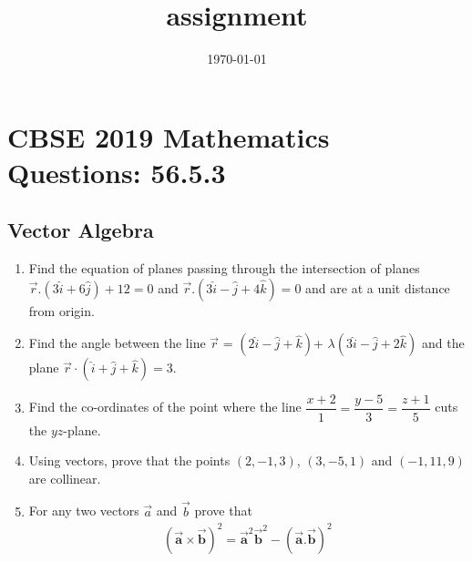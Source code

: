 \documentclass[12pt,-letter paper]{article}
\let\vec\mathbf{}
\let\vec\mathbf{}
\let\vec\mathbf{}
\providecommand{\brak}[1]{\ensuremath{\left(#1\right)}}
\begin{document}
\title{assignment}
\date{\today}
\maketitle
\section*{CBSE 2019 Mathematics Questions: 56.5.3}
\subsection*{ Vector Algebra}
\begin{enumerate}
\item Find the equation of planes passing through the intersection of planes$ \overrightarrow r.\brak{3\hat{i}+6\hat{j}}+12=0$ and $ \overrightarrow {r}.\brak{3\hat{i}-\hat{j}+4\hat{k}}=0$ and are at a unit distance from origin.                         
\item  Find the angle between the line $\overrightarrow{r}$ = $\brak{2\hat{i}-\hat{j}+\hat{k}}$+ $\lambda\brak{3\hat{i}-\hat{j}+2\hat{k}}$ and the plane $\overrightarrow{r}\cdot\brak{\hat{i} +\hat{j}+\hat{k}}=3$.
\item Find the co-ordinates of the point where the line $\dfrac{x+2}{1}=\dfrac{y-5}{3}=\dfrac{z+1}{5}$ cuts the $yz$-plane.
\item Using vectors, prove that the points $\brak{2,-1,3}$, $\brak{3,-5,1}$ and $\brak{-1,11,9}$ are collinear.
\item For any two vectors $\overrightarrow{a}$ and $\overrightarrow{b}$ prove that 
	\begin{align*}	\brak{\overrightarrow{\vec{a}}\times\overrightarrow{\vec{b}}}^{2}=\overrightarrow{\vec{a}}^{2}\overrightarrow{\vec{b}}^{2}-\brak{\overrightarrow{\vec{a}}.\overrightarrow{\vec{b}}}^{2}
	\end{align*}                            

\end{enumerate}
\end{document}
